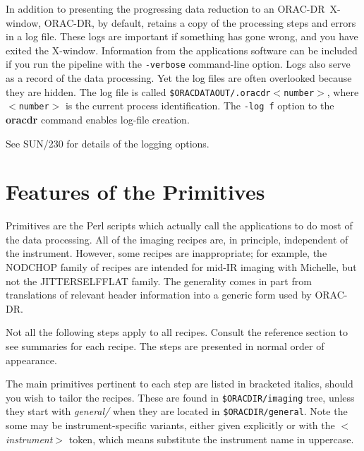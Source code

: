 \documentclass[twoside,11pt]{article}
\newcommand{\htmlref}[2]{#1}
\newcommand{\xref}[3]{#1}
\newcommand{\xlabel}[1]{}
\renewcommand{\_}{\texttt{\symbol{95}}}
\newcommand{\ORACDR}{{\footnotesize ORAC-DR}}
\begin{document}
In addition to presenting the progressing data reduction to an
\ORACDR\ X-window, \ORACDR, by default, retains a copy of the
processing steps and errors in a log file.  These logs are important
if something has gone wrong, and you have exited the X-window.
Information from the applications software can be included if you run
the pipeline with the {\tt -verbose} command-line option.  Logs also
serve as a record of the data processing.  Yet the log files are often
overlooked because they are hidden.  The log file is called
{\tt\$ORAC\_DATA\_OUT/.oracdr\_$<$number$>$}, where {\tt$<$number$>$}
is the current process identification.  The {\tt -log f} option to the
{\bf oracdr} command enables log-file creation.

See \xref{SUN/230}{sun230}{windows_and_output} for details of the
logging options.

\section{\xlabel{features_of_the_primitives}Features of the
Primitives\label{features_of_the_primitives}}

Primitives are the Perl scripts which actually call the applications
to do most of the data processing.  All of the imaging recipes are, in
principle, independent of the instrument.  However, some recipes are
inappropriate; for example, the NOD\_CHOP family of recipes are
intended for mid-IR imaging with Michelle, but not the
\htmlref{JITTER\_SELF\_FLAT}{JITTER\_SELF\_FLAT} family.  The generality
comes in part from translations of relevant header information into a
generic form used by \ORACDR.

Not all the following steps apply to all recipes.  Consult the
\htmlref{reference section}{recipes} to see summaries for each recipe.
The steps are presented in normal order of appearance.

The main primitives pertinent to each step are listed in bracketed
italics, should you wish to tailor the recipes.  These are found in
{\tt\$ORAC\_DIR/imaging} tree, unless they start with {\em general/}
when they are located in {\tt\$ORAC\_DIR/general}.  Note the some may
be instrument-specific variants, either given explicitly or with the
{\em$<$instrument$>$} token, which means substitute the instrument
name in uppercase. 
\end{document}
